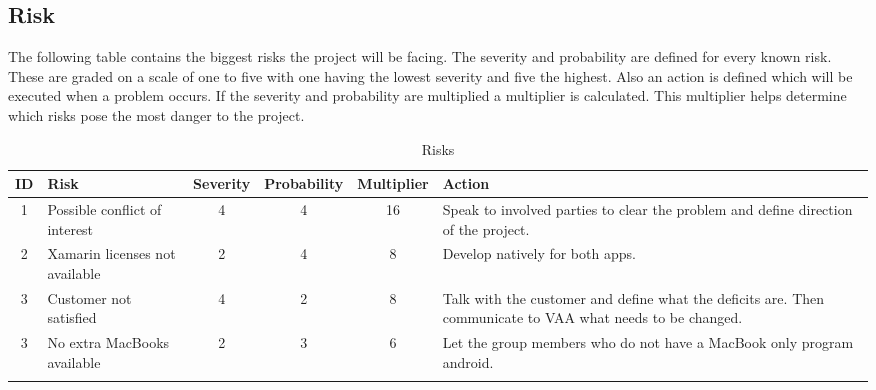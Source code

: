\subsection{Risk}
The following table contains the biggest risks the project will be facing. The severity and probability are defined for every known risk. These are graded on a scale of one to five with one having the lowest severity and five the highest. Also an action is defined which will be executed when a problem occurs. If the severity and probability are multiplied a multiplier is calculated. This multiplier helps determine which risks pose the most danger to the project.

\begin{longtable}{ c p{3cm} c c c p{4cm} }
	\textbf{ID} & \textbf{Risk} & \textbf{Severity} & \textbf{Probability} & \textbf{Multiplier} & \textbf{Action} \\
	\hline
	\endhead
	1 & Possible conflict of interest  & 4 & 4 & 16 & Speak to involved parties to clear the problem and define direction of the project. \\
	2 & Xamarin licenses not available & 2 & 4 & 8 & Develop natively for both apps. \\
	3 & Customer not satisfied  & 4 & 2 & 8 & Talk with the customer and define what the deficits are. Then communicate to VAA what needs to be changed.\\
	3 & No extra MacBooks available  & 2 & 3 & 6 & Let the group members who do not have a MacBook only program android. \\	
	\caption{Risks\label{risk}}
\end{longtable}
